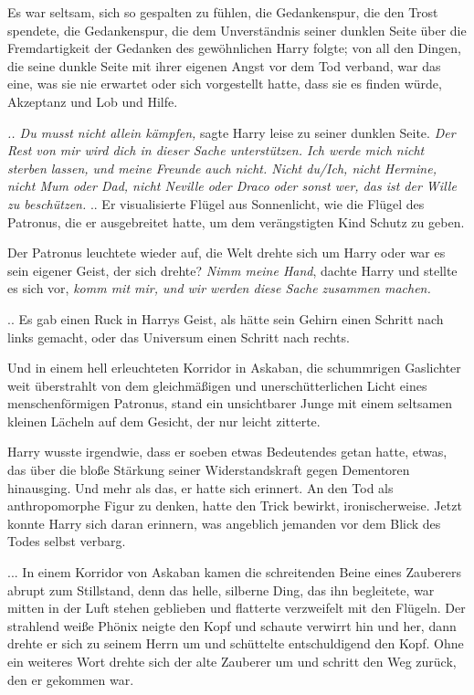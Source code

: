 Es war seltsam, sich so gespalten zu fühlen, die Gedankenspur, die den Trost
spendete, die Gedankenspur, die dem Unverständnis seiner dunklen Seite über die
Fremdartigkeit der Gedanken des gewöhnlichen Harry folgte; von all den Dingen,
die seine dunkle Seite mit ihrer eigenen Angst vor dem Tod verband, war das
eine, was sie nie erwartet oder sich vorgestellt hatte, dass sie es finden
würde, Akzeptanz und Lob und Hilfe.

\emph{.. Du musst nicht allein kämpfen,} sagte Harry leise zu seiner dunklen
Seite.\emph{ Der Rest von mir wird dich in dieser Sache unterstützen. Ich werde
mich nicht sterben lassen, und meine Freunde auch nicht. Nicht du/Ich, nicht
Hermine, nicht Mum oder Dad, nicht Neville oder Draco oder sonst wer, das ist
der Wille zu beschützen.} .. Er visualisierte Flügel aus Sonnenlicht, wie die
Flügel des Patronus, die er ausgebreitet hatte, um dem verängstigten Kind Schutz
zu geben.

Der Patronus leuchtete wieder auf, die Welt drehte sich um Harry oder war es
sein eigener Geist, der sich drehte? \emph{Nimm meine Hand}, dachte Harry und
stellte es sich vor, \emph{komm mit mir, und wir werden diese Sache zusammen
machen.}

.. Es gab einen Ruck in Harrys Geist, als hätte sein Gehirn einen Schritt nach
links gemacht, oder das Universum einen Schritt nach rechts.

Und in einem hell erleuchteten Korridor in Askaban, die schummrigen Gaslichter
weit überstrahlt von dem gleichmäßigen und unerschütterlichen Licht eines
menschenförmigen Patronus, stand ein unsichtbarer Junge mit einem seltsamen
kleinen Lächeln auf dem Gesicht, der nur leicht zitterte.

Harry wusste irgendwie, dass er soeben etwas Bedeutendes getan hatte, etwas, das
über die bloße Stärkung seiner Widerstandskraft gegen Dementoren hinausging. Und
mehr als das, er hatte sich erinnert. An den Tod als anthropomorphe Figur zu
denken, hatte den Trick bewirkt, ironischerweise. Jetzt konnte Harry sich daran
erinnern, was angeblich jemanden vor dem Blick des Todes selbst verbarg.

... In einem Korridor von Askaban kamen die schreitenden Beine eines Zauberers
abrupt zum Stillstand, denn das helle, silberne Ding, das ihn begleitete, war
mitten in der Luft stehen geblieben und flatterte verzweifelt mit den Flügeln.
Der strahlend weiße Phönix neigte den Kopf und schaute verwirrt hin und her,
dann drehte er sich zu seinem Herrn um und schüttelte entschuldigend den Kopf.
Ohne ein weiteres Wort drehte sich der alte Zauberer um und schritt den Weg
zurück, den er gekommen war.

